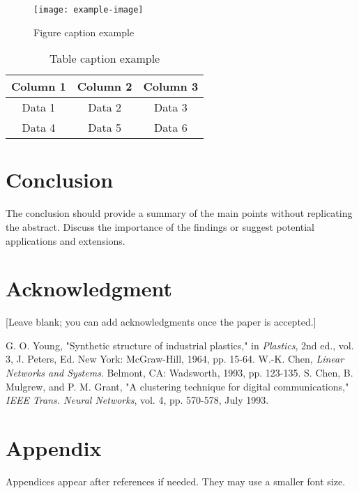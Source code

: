 \documentclass[10pt, twocolumn]{article}
\begin{document}
\begin{figure}[h]
    \centering
    \texttt{[image: example-image]} %
    \caption{Figure caption example}
\end{figure}

\begin{table}[h]
    \centering
    \caption{Table caption example}
    \begin{tabular}{|c|c|c|}
        \hline
        Column 1 & Column 2 & Column 3 \\
        \hline
        Data 1 & Data 2 & Data 3 \\
        Data 4 & Data 5 & Data 6 \\
        \hline
    \end{tabular}
\end{table}

\section{Conclusion}
The conclusion should provide a summary of the main points without replicating the abstract. Discuss the importance of the findings or suggest potential applications and extensions.

\section*{Acknowledgment}
[Leave blank; you can add acknowledgments once the paper is accepted.]

\begin{thebibliography}{9}
     G. O. Young, "Synthetic structure of industrial plastics," in \textit{Plastics}, 2nd ed., vol. 3, J. Peters, Ed. New York: McGraw-Hill, 1964, pp. 15-64.
     W.-K. Chen, \textit{Linear Networks and Systems}. Belmont, CA: Wadsworth, 1993, pp. 123-135.
     S. Chen, B. Mulgrew, and P. M. Grant, "A clustering technique for digital communications," \textit{IEEE Trans. Neural Networks}, vol. 4, pp. 570-578, July 1993.
\end{thebibliography}

\appendix
\section*{Appendix}
Appendices appear after references if needed. They may use a smaller font size.
\end{document}
